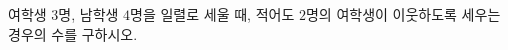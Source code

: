 \hspace*{2mm}\begin{minipage}[t]{\dimexpr\linewidth-2mm\relax}\vspace{0pt}
여학생 $3$명, 남학생 $4$명을 일렬로 세울 때, 적어도 $2$명의 여학생이 이웃하도록 세우는 경우의 수를 구하시오.\end{minipage}
